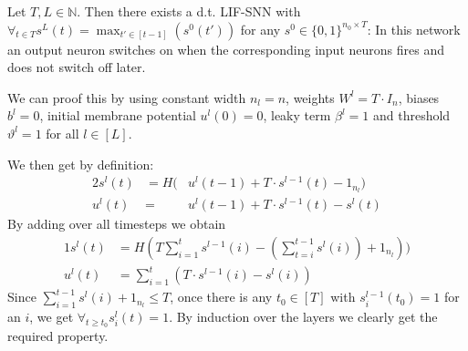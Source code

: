 \begin{example}\label{ex:2}
  Let \(T,L∈ℕ\). Then there exists a d.t. LIF-SNN with \(∀_{t∈T}s^L(t)=\max_{t'∈[t-1]}(s^0(t'))\) for any \(s^0∈\{0,1\}^{n_0×T}\): In this network an output neuron switches on when the corresponding input neurons fires and does not switch off later.

  We can proof this by using constant width \(n_l=n\), weights \(W^l=T·I_n\), biases \(b^l=0\), initial membrane potential \(u^l(0)=0\), leaky term \(β^l=1\) and threshold \(ϑ^l=1\) for all \(l∈[L]\).

  We then get by definition:
  \begin{alignat*}{2}
    s^l(t) & = H(&u^l(t-1)+T·s^{l-1}(t)-1_{n_l}) \\
    u^l(t) & = &u^l(t-1)+T·s^{l-1}(t)-s^l(t)
  \end{alignat*}
  By adding over all timesteps we obtain
  \begin{alignat*}{1}
    s^l(t) & = H(T\sum_{i=1}^ts^{l-1}(i)-(\sum_{t=i}^{t-1}s^l(i))+1_{n_l}) ) \\
    u^l(t) & = \sum_{i=1}^t(T·s^{l-1}(i)-s^l(i))
  \end{alignat*}
  Since \(\sum_{i=1}^{t-1}s^l(i)+1_{n_l}≤T\), once there is any \(t_0∈[T]\) with \(s^{l-1}_i(t_0)=1\) for an \(i\), we get \(∀_{t≥t_0}s^l_i(t)=1\).
  By induction over the layers we clearly get the required property.
\end{example}

\cleardoublepage

